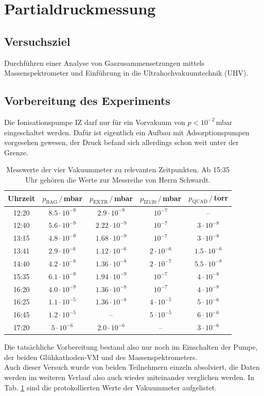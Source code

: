 \documentclass[german, parskip=full]{scrartcl}
\newcommand{\tecxt}{}
\begin{document}
\section{Partialdruckmessung}
\subsection{Versuchsziel}
Durchführen einer Analyse von Gaszusammensetzungen mittels Massenspektrometer und Einführung in die Ultrahochvakuumtechnik (UHV).
\subsection{Vorbereitung des Experiments}
Die Ionisationspumpe IZ darf nur für ein Vorvakuum von $p<10^{-2}\,$mbar eingeschaltet werden. Dafür ist eigentlich ein Aufbau mit Adsorptionspumpen vorgesehen gewesen, der Druck befand sich allerdings schon weit unter der Grenze. 
\begin{table}[!htp]
\centering
\begin{tabular}{c|c|c|c|c}
Uhrzeit&$p_\tecxt\text{BAG}\,/\,$mbar&$p_\tecxt\text{EXTR}\,/\,$mbar&$p_\tecxt\text{IZ120}\,/\,$mbar&$p_\tecxt\text{QUAD}\,/\,$torr\\ \hline
12:20&$8.5\cdot 10^{-9}$&$2.9\cdot 10^{-9}$&$10^{-7}$&--\\
12:40&$5.6\cdot 10^{-9}$&$2.22\cdot 10^{-9}$&$10^{-7}$&$3\cdot 10^{-8}$\\
13:15&$4.8\cdot 10^{-9}$&$1.68\cdot 10^{-9}$&$10^{-7}$&$3\cdot 10^{-8}$\\
13:41&$2.9\cdot 10^{-6}$&$1.12\cdot 10^{-6}$&$2\cdot 10^{-6}$&$1.5\cdot 10^{-6}$\\
14:40&$4.2\cdot 10^{-8}$&$1.36\cdot 10^{-8}$&$2\cdot 10^{-7}$&$5.5\cdot 10^{-8}$\\ \hline
15:35&$6.1\cdot 10^{-9}$&$1.94\cdot 10^{-9}$&$10^{-7}$&$4\cdot 10^{-8}$\\
16:20&$4.0\cdot 10^{-9}$&$1.36\cdot 10^{-8}$&$10^{-7}$&$4\cdot 10^{-8}$\\
16:25&$1.1\cdot 10^{-5}$&$1.36\cdot 10^{-8}$&$4\cdot 10^{-5}$&$5\cdot 10^{-6}$\\
16:45&$1.2\cdot 10^{-5}$&--&$5\cdot 10^{-5}$&$6\cdot 10^{-6}$\\
17:20&$5\cdot 10^{-6}$&$2.0\cdot 10^{-6}$&--&$3\cdot 10^{-6}$\\
\end{tabular}
\caption{Messwerte der vier Vakuummeter zu relevanten Zeitpunkten. Ab 15:35 Uhr gehören die Werte zur Messreihe von Herrn Schwardt.}
\label{table:druckmessung vier vakuummeter}
\end{table}
Die tatsächliche Vorbereitung bestand also nur noch im Einschalten der Pumpe, der beiden Glühkathoden-VM und des Massenspektrometers.\\
Auch dieser Versuch wurde von beiden Teilnehmern einzeln absolviert, die Daten werden im weiteren Verlauf also auch wieder miteinander verglichen werden. In Tab. \ref{table:druckmessung vier vakuummeter} sind die protokollierten Werte der Vakuummeter aufgelistet.
\end{document}

